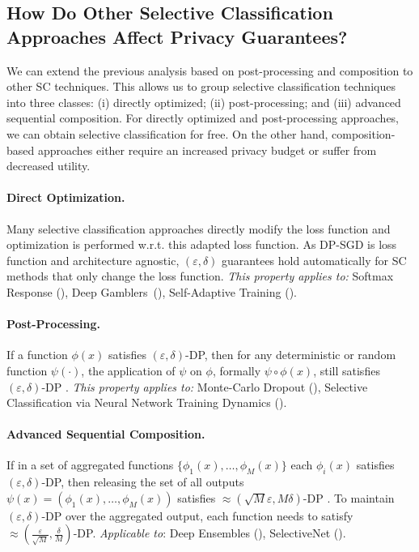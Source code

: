 \subsection{How Do Other Selective Classification Approaches Affect Privacy Guarantees?} %
\label{sec:sc_affects_dp}

We can extend the previous analysis based on post-processing and composition to other SC techniques. This allows us to group selective classification techniques into three classes: (i) directly optimized; (ii) post-processing; and (iii) advanced sequential composition. For directly optimized and post-processing approaches, we can obtain selective classification for free. On the other hand, composition-based approaches either require an increased privacy budget or suffer from decreased utility.

\paragraph{Direct Optimization.} Many selective classification approaches directly modify the loss function and optimization is performed w.r.t. this adapted loss function. As DP-SGD is loss function and architecture agnostic, $(\varepsilon, \delta)$ guarantees hold automatically for SC methods that only change the loss function. \emph{This property applies to:} Softmax Response (\sr), Deep Gamblers~(\dg), Self-Adaptive Training (\sat).

\paragraph{Post-Processing.} If a function $\phi(x)$ satisfies $(\varepsilon,\delta)$-DP, then for any deterministic or random function $\psi(\cdot)$, the application of $\psi$ on $\phi$, formally $\psi \circ \phi (x)$, still satisfies $(\varepsilon,\delta)$-DP \citep{dwork2006calibrating}. \emph{This property applies to:} Monte-Carlo Dropout (\mcdo), Selective Classification via Neural Network Training Dynamics (\sctd).

\paragraph{Advanced Sequential Composition.} If in a set of aggregated functions $\{\phi_1(x), \ldots, \phi_M(x)\}$ each $\phi_i(x)$ satisfies $(\varepsilon,\delta)$-DP, then releasing the set of all outputs $\psi(x) = (\phi_1(x), \ldots, \phi_M(x))$ satisfies $\approx (\sqrt{M}\varepsilon,M\delta)$-DP \citep{dwork2006calibrating}. To maintain $(\varepsilon, \delta)$-DP over the aggregated output, each function needs to satisfy $\approx(\frac{\varepsilon}{\sqrt M}, \frac{\delta}{M})$-DP. \emph{Applicable to}: Deep Ensembles (\de), SelectiveNet (\sn).

